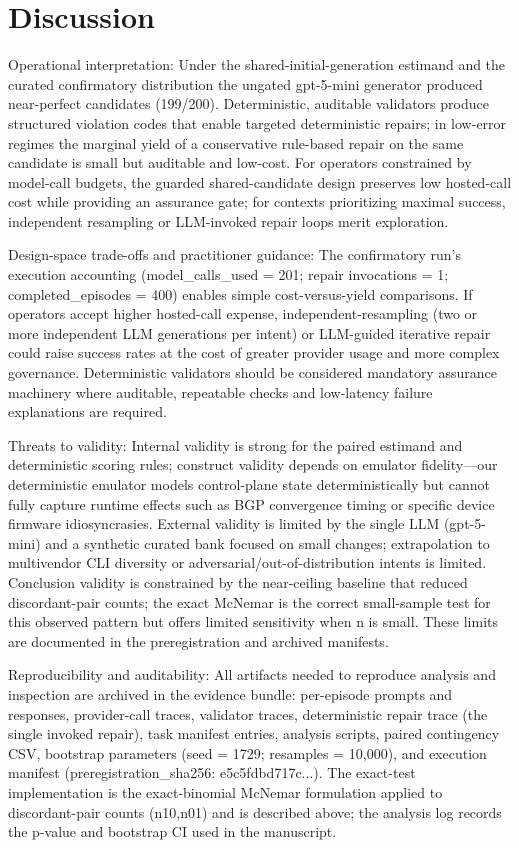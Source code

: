 \documentclass[conference]{IEEEtran}
\begin{document}
\section{Discussion}
Operational interpretation: Under the shared-initial-generation estimand and the curated confirmatory distribution the ungated gpt-5-mini generator produced near-perfect candidates (199/200). Deterministic, auditable validators produce structured violation codes that enable targeted deterministic repairs; in low-error regimes the marginal yield of a conservative rule-based repair on the same candidate is small but auditable and low-cost. For operators constrained by model-call budgets, the guarded shared-candidate design preserves low hosted-call cost while providing an assurance gate; for contexts prioritizing maximal success, independent resampling or LLM-invoked repair loops merit exploration.

Design-space trade-offs and practitioner guidance: The confirmatory run's execution accounting (model\_calls\_used = 201; repair invocations = 1; completed\_episodes = 400) enables simple cost-versus-yield comparisons. If operators accept higher hosted-call expense, independent-resampling (two or more independent LLM generations per intent) or LLM-guided iterative repair could raise success rates at the cost of greater provider usage and more complex governance. Deterministic validators should be considered mandatory assurance machinery where auditable, repeatable checks and low-latency failure explanations are required.

Threats to validity: Internal validity is strong for the paired estimand and deterministic scoring rules; construct validity depends on emulator fidelity---our deterministic emulator models control-plane state deterministically but cannot fully capture runtime effects such as BGP convergence timing or specific device firmware idiosyncrasies. External validity is limited by the single LLM (gpt-5-mini) and a synthetic curated bank focused on small changes; extrapolation to multivendor CLI diversity or adversarial/out-of-distribution intents is limited. Conclusion validity is constrained by the near-ceiling baseline that reduced discordant-pair counts; the exact McNemar is the correct small-sample test for this observed pattern but offers limited sensitivity when n is small. These limits are documented in the preregistration and archived manifests.

Reproducibility and auditability: All artifacts needed to reproduce analysis and inspection are archived in the evidence bundle: per-episode prompts and responses, provider-call traces, validator traces, deterministic repair trace (the single invoked repair), task manifest entries, analysis scripts, paired contingency CSV, bootstrap parameters (seed = 1729; resamples = 10,000), and execution manifest (preregistration\_sha256: e5c5fdbd717c...). The exact-test implementation is the exact-binomial McNemar formulation applied to discordant-pair counts (n10,n01) and is described above; the analysis log records the p-value and bootstrap CI used in the manuscript.
\end{document}
